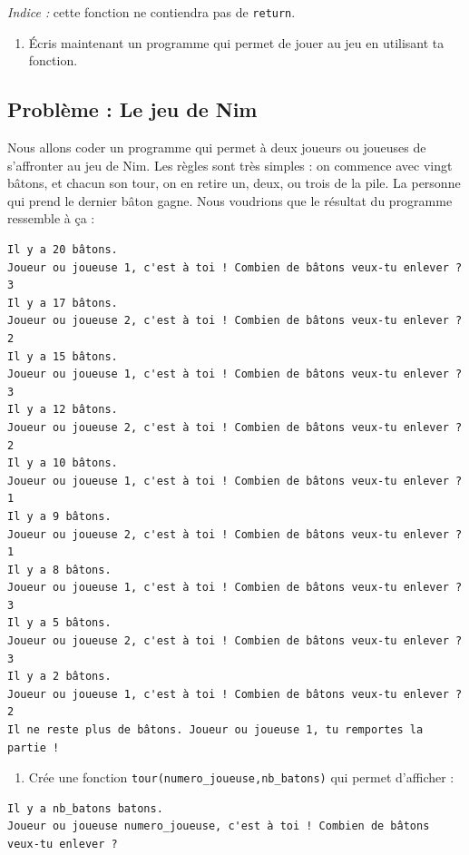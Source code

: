 \documentclass[a4paper,french,11pt]{article}
\providecommand{\tightlist}{%
  \setlength{\itemsep}{0pt}\setlength{\parskip}{0pt}}
\begin{document}
\emph{Indice :} cette fonction ne contiendra pas de
\texttt{return}.

\begin{enumerate}
\def\labelenumi{\arabic{enumi}.}
\setcounter{enumi}{1}
\tightlist
\item
  Écris maintenant un programme qui permet de jouer au jeu en utilisant
  ta fonction.
\end{enumerate}

\hypertarget{probluxe8me-le-jeu-de-nim}{%
\subsection{Problème : Le jeu de Nim}\label{probluxe8me-le-jeu-de-nim}}

Nous allons coder un programme qui permet à deux joueurs ou joueuses de
s'affronter au jeu de Nim. Les règles sont très simples : on commence
avec vingt bâtons, et chacun son tour, on en retire un, deux, ou trois
de la pile. La personne qui prend le dernier bâton gagne. Nous voudrions
que le résultat du programme ressemble à ça :

\begin{verbatim}
Il y a 20 bâtons.
Joueur ou joueuse 1, c'est à toi ! Combien de bâtons veux-tu enlever ?
3
Il y a 17 bâtons.
Joueur ou joueuse 2, c'est à toi ! Combien de bâtons veux-tu enlever ?
2
Il y a 15 bâtons.
Joueur ou joueuse 1, c'est à toi ! Combien de bâtons veux-tu enlever ?
3
Il y a 12 bâtons.
Joueur ou joueuse 2, c'est à toi ! Combien de bâtons veux-tu enlever ?
2
Il y a 10 bâtons.
Joueur ou joueuse 1, c'est à toi ! Combien de bâtons veux-tu enlever ?
1
Il y a 9 bâtons.
Joueur ou joueuse 2, c'est à toi ! Combien de bâtons veux-tu enlever ?
1
Il y a 8 bâtons.
Joueur ou joueuse 1, c'est à toi ! Combien de bâtons veux-tu enlever ?
3
Il y a 5 bâtons.
Joueur ou joueuse 2, c'est à toi ! Combien de bâtons veux-tu enlever ?
3
Il y a 2 bâtons.
Joueur ou joueuse 1, c'est à toi ! Combien de bâtons veux-tu enlever ?
2
Il ne reste plus de bâtons. Joueur ou joueuse 1, tu remportes la partie !
\end{verbatim}

\begin{enumerate}
\def\labelenumi{\arabic{enumi}.}
\tightlist
\item
  Crée une fonction \texttt{tour(numero_joueuse,nb_batons)}
  qui permet d'afficher :
\end{enumerate}

\begin{verbatim}
Il y a nb_batons batons.
Joueur ou joueuse numero_joueuse, c'est à toi ! Combien de bâtons veux-tu enlever ?
\end{verbatim}
\end{document}
